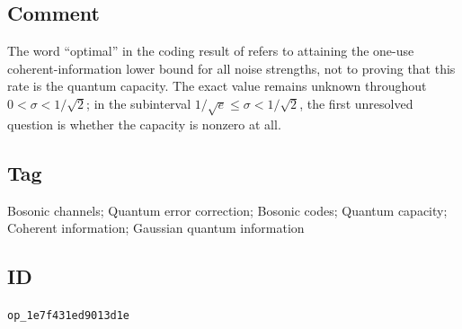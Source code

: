 \subsection*{Comment}

The word ``optimal'' in the coding result of
 refers to attaining the
one-use coherent-information lower bound for all noise strengths, not to
proving that this rate is the quantum capacity.  The exact value remains
unknown throughout $0<\sigma<1/\sqrt2$; in the subinterval
$1/\sqrt e\leq\sigma<1/\sqrt2$, the first unresolved question is whether the
capacity is nonzero at all.

\subsection*{Tag}

Bosonic channels; Quantum error correction; Bosonic codes; Quantum capacity;
Coherent information; Gaussian quantum information

\subsection*{ID}

\texttt{op\_1e7f431ed9013d1e}
